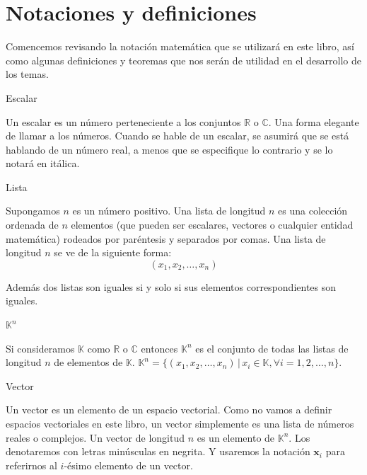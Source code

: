 \section{Notaciones y definiciones}

Comencemos revisando la notación matemática que se utilizará en este libro, así como algunas definiciones y teoremas que nos serán de utilidad en el desarrollo de los temas.

\begin{definition}
    Escalar 

    Un escalar es un número perteneciente a los conjuntos $\mathbb{R}$ o $\mathbb{C}$. Una forma elegante
    de llamar a los números.
    Cuando se hable de un escalar, se asumirá que se está hablando de un número real, a menos que se 
    especifique lo contrario y se lo notará en itálica.
\end{definition}


\begin{definition}
    Lista 

    Supongamos $n$ es un número positivo. Una lista de longitud $n$ es una colección ordenada de $n$ elementos 
    (que pueden ser escalares, vectores o cualquier entidad matemática) rodeados por paréntesis y separados por comas.
    Una lista de longitud $n$ se ve de la siguiente forma:
    \begin{equation}
        (x_1, x_2, \ldots, x_n)
    \end{equation}

    Además dos listas son iguales si y solo si sus elementos correspondientes son iguales.
\end{definition}

\begin{definition}
    $\mathbb{K}^n$
    
    Si consideramos $\mathbb{K}$ como $\mathbb{R}$ o $\mathbb{C}$ entonces $\mathbb{K}^n$ es el conjunto de todas las listas de longitud $n$ de elementos de $\mathbb{K}$.
    $\mathbb{K}^n = \{(x_1, x_2, \ldots, x_n) \,|\, x_i \in \mathbb{K}, \forall i = 1, 2, \ldots, n\}$.

\end{definition}

\begin{definition}
    Vector
    
    Un vector es un elemento de un espacio vectorial. Como no vamos a definir espacios vectoriales en este libro, un vector simplemente es una lista de números reales o complejos. Un vector de longitud $n$ es un elemento de $\mathbb{K}^n$. Los denotaremos con letras minúsculas en negrita. Y usaremos la notación $\mathbf{x}_i$ para referirnos al $i$-ésimo elemento de un vector.
\end{definition}

